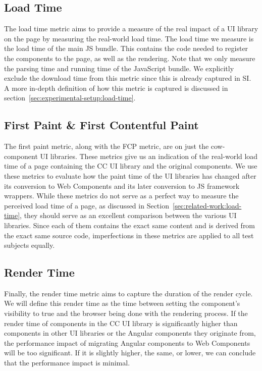 \subsection{Load Time}
The load time metric aims to provide a measure of the real impact of a UI library on the page by measuring the real-world load time. The load time we measure is the load time of the main JS bundle. This contains the code needed to register the components to the page, as well as the rendering. Note that we only measure the parsing time and running time of the JavaScript bundle. We explicitly exclude the download time from this metric since this is already captured in SI\@. A more in-depth definition of how this metric is captured is discussed in section~\ref{sec:experimental-setup:load-time}.

\subsection{First Paint \& First Contentful Paint}
The first paint metric, along with the FCP metric, are on just the cow-component UI libraries. These metrics give us an indication of the real-world load time of a page containing the CC UI library and the original components. We use these metrics to evaluate how the paint time of the UI libraries has changed after its conversion to Web Components and its later conversion to JS framework wrappers. While these metrics do not serve as a perfect way to measure the perceived load time of a page, as discussed in Section~\ref{sec:related-work:load-time}, they should serve as an excellent comparison between the various UI libraries. Since each of them contains the exact same content and is derived from the exact same source code, imperfections in these metrics are applied to all test subjects equally.

\subsection{Render Time}
Finally, the render time metric aims to capture the duration of the render cycle. We will define this render time as the time between setting the component's visibility to true and the browser being done with the rendering process. If the render time of components in the CC UI library is significantly higher than components in other UI libraries or the Angular components they originate from, the performance impact of migrating Angular components to Web Components will be too significant. If it is slightly higher, the same, or lower, we can conclude that the performance impact is minimal.


